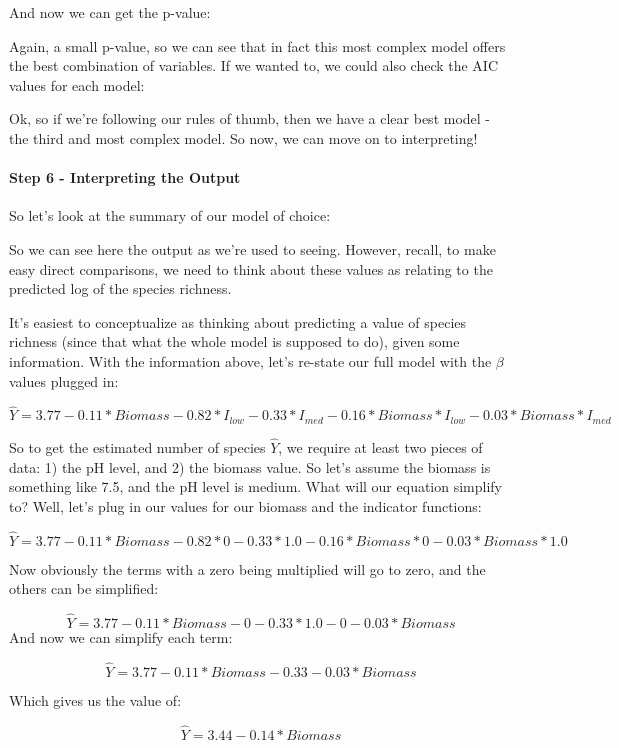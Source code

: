 \documentclass[
]{article}
\begin{document}
And now we can get the p-value:

Again, a small p-value, so we can see that in fact this most complex
model offers the best combination of variables. If we wanted to, we
could also check the AIC values for each model:

Ok, so if we're following our rules of thumb, then we have a clear best
model - the third and most complex model. So now, we can move on to
interpreting!

\hypertarget{step-6---interpreting-the-output-1}{%
\paragraph{Step 6 - Interpreting the
Output}\label{step-6---interpreting-the-output-1}}

So let's look at the summary of our model of choice:

So we can see here the output as we're used to seeing. However, recall,
to make easy direct comparisons, we need to think about these values as
relating to the predicted log of the species richness.

It's easiest to conceptualize as thinking about predicting a value of
species richness (since that what the whole model is supposed to do),
given some information. With the information above, let's re-state our
full model with the \(\beta\) values plugged in:

\[\hat{Y} = 3.77 - 0.11*Biomass - 0.82*I_{low} - 0.33*I_{med}  - 0.16*Biomass*I_{low} - 0.03*Biomass*I_{med}\]

So to get the estimated number of species \(\hat{Y}\), we require at
least two pieces of data: 1) the pH level, and 2) the biomass value. So
let's assume the biomass is something like 7.5, and the pH level is
medium. What will our equation simplify to? Well, let's plug in our
values for our biomass and the indicator functions:

\[\hat{Y} = 3.77 - 0.11*Biomass - 0.82*0 - 0.33*1.0  - 0.16*Biomass*0 - 0.03*Biomass*1.0\]

Now obviously the terms with a zero being multiplied will go to zero,
and the others can be simplified:

\[\hat{Y} = 3.77 - 0.11*Biomass - 0 - 0.33*1.0  - 0 - 0.03*Biomass\] And
now we can simplify each term:

\[\hat{Y} = 3.77 - 0.11*Biomass - 0.33  - 0.03*Biomass\]

Which gives us the value of:

\[\hat{Y} = 3.44 - 0.14*Biomass\]
\end{document}

